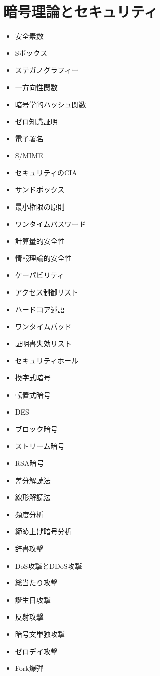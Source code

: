 \documentclass[a4j, titlepage, 11pt]{jsarticle}
\begin{document}
\clearpage
\section{暗号理論とセキュリティ}
\begin{multicols}{2}
\begin{itemize}
	\item 安全素数
	\item Sボックス
	\item ステガノグラフィー
	\item 一方向性関数
	\item 暗号学的ハッシュ関数
	\item ゼロ知識証明
	\item 電子署名
	\item S/MIME
	\item セキュリティのCIA
	\item サンドボックス	
	\item 最小権限の原則
	\item ワンタイムパスワード
	\item 計算量的安全性
	\item 情報理論的安全性
	\item ケーパビリティ
	\item アクセス制御リスト
	\item ハードコア述語
	\item ワンタイムパッド
	\item 証明書失効リスト
	\item セキュリティホール
	\item 換字式暗号
	\item 転置式暗号
	\item DES
	\item ブロック暗号
	\item ストリーム暗号
	\item RSA暗号
	\item 差分解読法
	\item 線形解読法
	\item 頻度分析
	\item 締め上げ暗号分析
	\item 辞書攻撃
	\item DoS攻撃とDDoS攻撃
	\item 総当たり攻撃
	\item 誕生日攻撃
	\item 反射攻撃
	\item 暗号文単独攻撃
	\item ゼロデイ攻撃
	\item Fork爆弾

\end{itemize}
\end{multicols}
\end{document}
